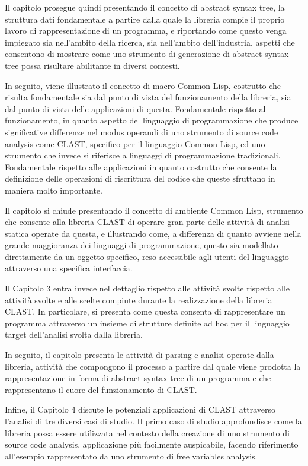 \documentclass{book}
\begin{document}
Il capitolo prosegue quindi presentando il concetto di abstract syntax tree, la
struttura dati fondamentale a partire dalla quale la libreria compie il proprio
lavoro di rappresentazione di un programma, e riportando come questo venga
impiegato sia nell’ambito della ricerca, sia nell’ambito dell’industria, aspetti
che consentono di mostrare come uno strumento di generazione di abstract syntax
tree possa risultare abilitante in diversi contesti.

In seguito, viene illustrato il concetto di macro Common Lisp, costrutto che
risulta fondamentale sia dal punto di vista del funzionamento della libreria,
sia dal punto di vista delle applicazioni di questa. Fondamentale rispetto al
funzionamento, in quanto aspetto del linguaggio di programmazione che produce
significative differenze nel modus operandi di uno strumento di source code
analysis come CLAST, specifico per il linguaggio Common Lisp, ed uno strumento
che invece si riferisce a linguaggi di programmazione tradizionali. Fondamentale
rispetto alle applicazioni in quanto costrutto che consente la definizione delle
operazioni di riscrittura del codice che queste sfruttano in maniera molto
importante.

Il capitolo si chiude presentando il concetto di ambiente Common Lisp, strumento
che consente alla libreria CLAST di operare gran parte delle attività di analisi
statica operate da questa, e illustrando come, a differenza di quanto avviene
nella grande maggioranza dei linguaggi di programmazione, questo sia modellato
direttamente da un oggetto specifico, reso accessibile agli utenti del
linguaggio attraverso una specifica interfaccia.

Il Capitolo 3 entra invece nel dettaglio rispetto alle attività svolte rispetto
alle attività svolte e alle scelte compiute durante la realizzazione della
libreria CLAST. In particolare, si presenta come questa consenta di
rappresentare un programma attraverso un insieme di strutture definite ad hoc
per il linguaggio target dell’analisi svolta dalla libreria.

In seguito, il capitolo presenta le attività di parsing e analisi operate dalla
libreria, attività che compongono il processo a partire dal quale viene prodotta
la rappresentazione in forma di abstract syntax tree di un programma e che
rappresentano il cuore del funzionamento di CLAST.

Infine, il Capitolo 4 discute le potenziali applicazioni di CLAST attraverso
l’analisi di tre diversi casi di studio. Il primo caso di studio approfondisce
come la libreria possa essere utilizzata nel contesto della creazione di uno
strumento di source code analysis, applicazione più facilmente auspicabile,
facendo riferimento all’esempio rappresentato da uno strumento di free variables
analysis.
\end{document}
